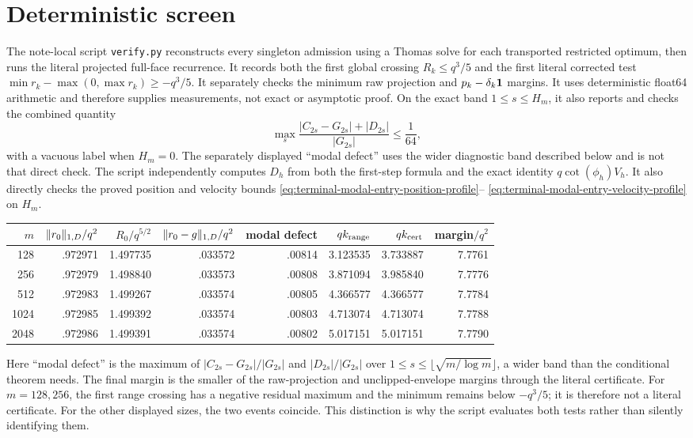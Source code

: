\section{Deterministic screen}
\label{sec:terminal-modal-screen}

The note-local script \texttt{verify.py} reconstructs every singleton
admission using a Thomas solve for each transported restricted optimum, then
runs the literal projected full-face recurrence.  It records both the first
global crossing $R_k\le q^3/5$ and the first literal corrected test
$\min r_k-\max(0,\max r_k)\ge-q^3/5$.  It separately checks the minimum raw
projection and $p_k-\delta_k\mathbf{1}$ margins.  It uses deterministic float64
arithmetic and therefore supplies measurements, not exact or asymptotic proof.
On the exact band $1\le s\le H_m$, it also reports and checks the combined
quantity
\[
 \max_s\frac{|C_{2s}-G_{2s}|+|D_{2s}|}{|G_{2s}|}\le\frac1{64},
\]
with a vacuous label when $H_m=0$.  The separately displayed ``modal defect''
uses the wider diagnostic band described below and is not that direct check.
The script independently computes $D_h$ from both the first-step formula and
the exact identity $q\cot(\phi_h)V_h$.  It also directly checks the proved
position and velocity bounds
\eqref{eq:terminal-modal-entry-position-profile}--
\eqref{eq:terminal-modal-entry-velocity-profile} on $H_m$.

\begin{center}
\begin{tabular}{@{}r|rrrrrrr@{}}
$m$ & $\lVert r_0\rVert_{1,D}/q^2$ & $R_0/q^{5/2}$
& $\lVert r_0-g\rVert_{1,D}/q^2$ & modal defect & $qk_{\rm range}$
& $qk_{\rm cert}$
& margin$/q^2$\\
\hline
128  & .972971 & 1.497735 & .033572 & .00814 & 3.123535 & 3.733887 & 7.7761\\
256  & .972979 & 1.498840 & .033573 & .00808 & 3.871094 & 3.985840 & 7.7776\\
512  & .972983 & 1.499267 & .033574 & .00805 & 4.366577 & 4.366577 & 7.7784\\
1024 & .972985 & 1.499392 & .033574 & .00803 & 4.713074 & 4.713074 & 7.7788\\
2048 & .972986 & 1.499391 & .033574 & .00802 & 5.017151 & 5.017151 & 7.7790\\
\end{tabular}
\end{center}

Here ``modal defect'' is the maximum of
$|C_{2s}-G_{2s}|/|G_{2s}|$ and $|D_{2s}|/|G_{2s}|$ over
$1\le s\le\lfloor\sqrt{m/\log m}\rfloor$, a wider band than the conditional
theorem needs.  The final margin is the smaller of the raw-projection and
unclipped-envelope margins through the literal certificate.  For $m=128,256$,
the first range crossing has a negative residual maximum and the minimum
remains below $-q^3/5$; it is therefore not a literal certificate.  For the
other displayed sizes, the two events coincide.  This distinction is why the
script evaluates both tests rather than silently identifying them.

